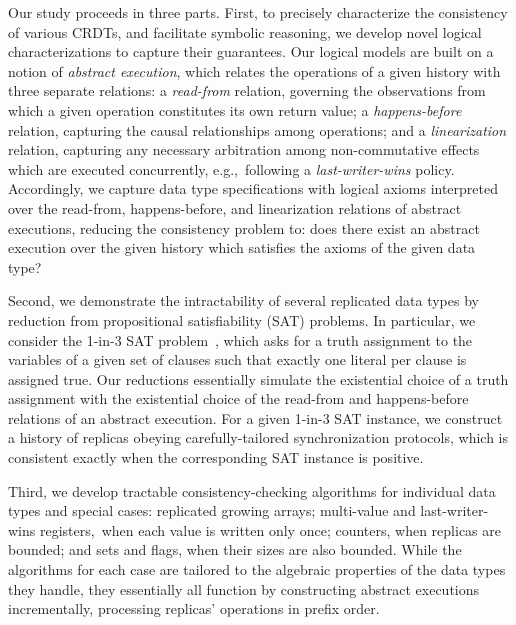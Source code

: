 Our study proceeds in three parts. First, to precisely characterize the consistency of various CRDTs, and facilitate symbolic reasoning, we develop novel logical characterizations to capture their guarantees. Our logical models are built on a notion of \emph{abstract execution}, which relates the operations of a given history with three separate relations: a \emph{read-from} relation, governing the observations from which a given operation constitutes its own return value; a \emph{happens-before} relation, capturing the causal relationships among operations; and a \emph{linearization} relation, capturing any necessary arbitration among non-commutative effects which are executed concurrently, e.g.,~following a \emph{last-writer-wins} policy. Accordingly, we capture data type specifications with logical axioms interpreted over the read-from, happens-before, and linearization relations of abstract executions, reducing the consistency problem to: does there exist an abstract execution over the given history which satisfies the axioms of the given data type?

Second, we demonstrate the intractability of several replicated data types by reduction from propositional satisfiability (SAT) problems. In particular, we consider the 1-in-3 SAT problem~\cite{DBLP:books/fm/GareyJ79}, which asks for a truth assignment to the variables of a given set of clauses such that exactly one literal per clause is assigned true. Our reductions essentially simulate the existential choice of a truth assignment with the existential choice of the read-from and happens-before relations of an abstract execution. For a given 1-in-3 SAT instance, we construct a history of replicas obeying carefully-tailored synchronization protocols, which is consistent exactly when the corresponding SAT instance is positive.

Third, we develop tractable consistency-checking algorithms for individual data types and special cases: replicated growing arrays; multi-value and last-writer-wins registers, when each value is written only once; counters, when replicas are bounded; and sets and flags, when their sizes are also bounded. While the algorithms for each case are tailored to the algebraic properties of the data types they handle, they essentially all function by constructing abstract executions incrementally, processing replicas’ operations in prefix order.

